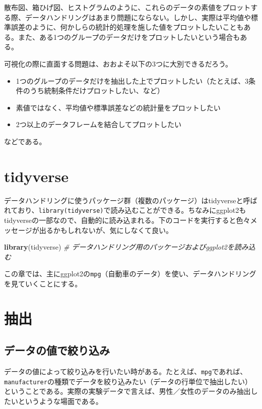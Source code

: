 \documentclass[]{book}
\newenvironment{Shaded}{\begin{snugshade}}{\end{snugshade}}
\newcommand{\KeywordTok}[1]{\textcolor[rgb]{0.13,0.29,0.53}{\textbf{#1}}}
\newcommand{\CommentTok}[1]{\textcolor[rgb]{0.56,0.35,0.01}{\textit{#1}}}
\newcommand{\NormalTok}[1]{#1}
\begin{document}
散布図、箱ひげ図、ヒストグラムのように、これらのデータの素値をプロットする際、データハンドリングはあまり問題にならない。しかし、実際は平均値や標準誤差のように、何かしらの統計的処理を施した値をプロットしたいこともある。また、ある1つのグループのデータだけをプロットしたいという場合もある。

可視化の際に直面する問題は、おおよそ以下の3つに大別できるだろう。

\begin{itemize}
\item
  1つのグループのデータだけを抽出した上でプロットしたい（たとえば、3条件のうち統制条件だけプロットしたい、など）
\item
  素値ではなく、平均値や標準誤差などの統計量をプロットしたい
\item
  2つ以上のデータフレームを結合してプロットしたい
\end{itemize}

などである。

\section{tidyverse}\label{tidyverse}

データハンドリングに使うパッケージ群（複数のパッケージ）はtidyverseと呼ばれており、\texttt{library(tidyverse)}で読み込むことができる。ちなみにggplot2もtidyverseの一部なので、自動的に読み込まれる。下のコードを実行すると色々メッセージが出るかもしれないが、気にしなくて良い。

\begin{Shaded}
\begin{Highlighting}[]
\KeywordTok{library}\NormalTok{(tidyverse) }\CommentTok{# データハンドリング用のパッケージおよびggplot2を読み込む}
\end{Highlighting}
\end{Shaded}

この章では、主にggplot2の\texttt{mpg}（自動車のデータ）を使い、データハンドリングを見ていくことにする。

\section{抽出}

\subsection{データの値で絞り込み}

データの値によって絞り込みを行いたい時がある。たとえば、\texttt{mpg}であれば、\texttt{manufacturer}の種類でデータを絞り込みたい（データの行単位で抽出したい）ということである。実際の実験データで言えば、男性／女性のデータのみ抽出したいというような場面である。
\end{document}
